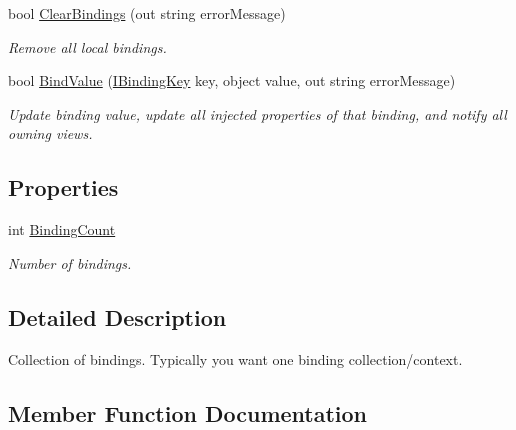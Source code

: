 \begin{DoxyCompactItemize}
bool \mbox{\hyperlink{interfacecp_games_1_1core_1_1_rapid_m_v_c_1_1_i_binding_collection_a81689073a35a424a96982276d64a27ad}{Clear\+Bindings}} (out string error\+Message)
\begin{DoxyCompactList}\small\item\em Remove all local bindings. \end{DoxyCompactList}\item 
bool \mbox{\hyperlink{interfacecp_games_1_1core_1_1_rapid_m_v_c_1_1_i_binding_collection_a2a468c5570b780133763d9592e2c1cb5}{Bind\+Value}} (\mbox{\hyperlink{interfacecp_games_1_1core_1_1_rapid_m_v_c_1_1_i_binding_key}{I\+Binding\+Key}} key, object value, out string error\+Message)
\begin{DoxyCompactList}\small\item\em Update binding value, update all injected properties of that binding, and notify all owning views. \end{DoxyCompactList}\end{DoxyCompactItemize}
\subsection*{Properties}
\begin{DoxyCompactItemize}
\item 
int \mbox{\hyperlink{interfacecp_games_1_1core_1_1_rapid_m_v_c_1_1_i_binding_collection_ae64df704d272c94fcb9fb16e896bc66b}{Binding\+Count}}
\begin{DoxyCompactList}\small\item\em Number of bindings. \end{DoxyCompactList}\end{DoxyCompactItemize}


\subsection{Detailed Description}
Collection of bindings. Typically you want one binding collection/context. 



\subsection{Member Function Documentation}
\mbox{\label{interfacecp_games_1_1core_1_1_rapid_m_v_c_1_1_i_binding_collection_afff4c2ad2ff9fb25c906864bc28f036f}} 
